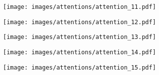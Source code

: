 \documentclass[10pt,twocolumn,letterpaper]{article}
\begin{document}
\begin{figure*}
\begin{subfigure}[t]{0.32\textwidth}
        \caption{}
        \label{fig:attention_10}
    \end{subfigure}
    \begin{subfigure}[t]{0.32\textwidth}
        \texttt{[image: images/attentions/attention\_11.pdf]}
        \caption{}
        \label{fig:attention_11}
    \end{subfigure}
    \begin{subfigure}[t]{0.32\textwidth}
        \texttt{[image: images/attentions/attention\_12.pdf]}
        \caption{}
        \label{fig:attention_12}
    \end{subfigure}
    \begin{subfigure}[t]{0.32\textwidth}
        \texttt{[image: images/attentions/attention\_13.pdf]}
        \caption{}
        \label{fig:attention_13}
    \end{subfigure}
    \begin{subfigure}[t]{0.32\textwidth}
        \texttt{[image: images/attentions/attention\_14.pdf]}
        \caption{}
        \label{fig:attention_14}
    \end{subfigure}
    \begin{subfigure}[t]{0.32\textwidth}
        \texttt{[image: images/attentions/attention\_15.pdf]}
        \caption{}
        \label{fig:attention_15}
    \end{subfigure}

    \label{fig:attention}
\end{figure*}
\end{document}

